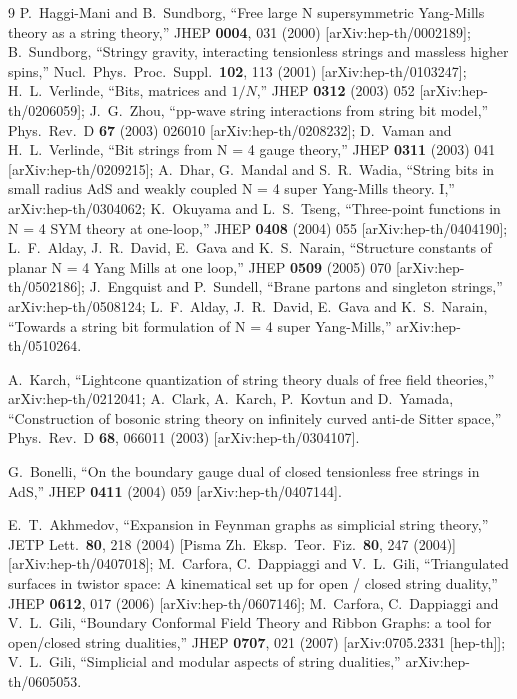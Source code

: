 \documentclass[11pt]{JHEP3}
\begin{document}
\begin{thebibliography}{9}
P.~Haggi-Mani and B.~Sundborg,
  ``Free large N supersymmetric Yang-Mills theory as a string theory,''
  JHEP {\bf 0004}, 031 (2000)
  [arXiv:hep-th/0002189];
B.~Sundborg,
  ``Stringy gravity, interacting tensionless strings and massless higher
  spins,''
  Nucl.\ Phys.\ Proc.\ Suppl.\  {\bf 102}, 113 (2001)
  [arXiv:hep-th/0103247];
  H.~L.~Verlinde,
  ``Bits, matrices and $1/N$,''
  JHEP {\bf 0312} (2003) 052
  [arXiv:hep-th/0206059];
  J.~G.~Zhou,
  ``pp-wave string interactions from string bit model,''
  Phys.\ Rev.\ D {\bf 67} (2003) 026010
  [arXiv:hep-th/0208232];
  D.~Vaman and H.~L.~Verlinde,
  ``Bit strings from N = 4 gauge theory,''
  JHEP {\bf 0311} (2003) 041
  [arXiv:hep-th/0209215];
  A.~Dhar, G.~Mandal and S.~R.~Wadia,
  ``String bits in small radius AdS and weakly coupled N = 4 super  Yang-Mills
  theory. I,''
  arXiv:hep-th/0304062;
  K.~Okuyama and L.~S.~Tseng,
  ``Three-point functions in N = 4 SYM theory at one-loop,''
  JHEP {\bf 0408} (2004) 055 [arXiv:hep-th/0404190];
  L.~F.~Alday, J.~R.~David, E.~Gava and K.~S.~Narain,
  ``Structure constants of planar N = 4 Yang Mills at one loop,''
  JHEP {\bf 0509} (2005) 070
  [arXiv:hep-th/0502186];
  J.~Engquist and P.~Sundell,
  ``Brane partons and singleton strings,''
  arXiv:hep-th/0508124;
  L.~F.~Alday, J.~R.~David, E.~Gava and K.~S.~Narain,
  ``Towards a string bit formulation of N = 4 super Yang-Mills,''
  arXiv:hep-th/0510264.

A.~Karch,
``Lightcone quantization of string theory duals of free field
theories,'' arXiv:hep-th/0212041;
A.~Clark, A.~Karch, P.~Kovtun and D.~Yamada,
``Construction of bosonic string theory on infinitely curved
anti-de  Sitter space,'' Phys.\ Rev.\ D {\bf 68}, 066011 (2003)
[arXiv:hep-th/0304107].

G.~Bonelli, ``On the boundary gauge dual of closed tensionless
free strings in AdS,'' JHEP {\bf 0411} (2004) 059
[arXiv:hep-th/0407144].

  E.~T.~Akhmedov,
  ``Expansion in Feynman graphs as simplicial string theory,''
  JETP Lett.\  {\bf 80}, 218 (2004)
  [Pisma Zh.\ Eksp.\ Teor.\ Fiz.\  {\bf 80}, 247 (2004)]
  [arXiv:hep-th/0407018];
M.~Carfora, C.~Dappiaggi and V.~L.~Gili,
  ``Triangulated surfaces in twistor space: A kinematical set up for open /
  closed string duality,''
  JHEP {\bf 0612}, 017 (2006)
  [arXiv:hep-th/0607146];
  M.~Carfora, C.~Dappiaggi and V.~L.~Gili,
  ``Boundary Conformal Field Theory and Ribbon Graphs: a tool for   open/closed
  string dualities,''
  JHEP {\bf 0707}, 021 (2007)
  [arXiv:0705.2331 [hep-th]];
V.~L.~Gili,
  ``Simplicial and modular aspects of string dualities,''
  arXiv:hep-th/0605053.
    

\end{thebibliography}
\end{document}
